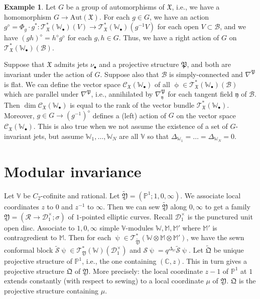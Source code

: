 \documentclass[12pt,a4paper,notitlepage]{report}
\theoremstyle{definition}
\newtheorem{eg}[df]{Example}
\theoremstyle{plain}
\newcommand{\fk}{\mathfrak}
\newcommand{\mc}{\mathcal}
\newcommand{\wtd}{\widetilde}
\newcommand{\scr}{\mathscr}
\newcommand{\yk}{\mathfrak y}
\newcommand{\mbb}{\mathbb}
\newcommand{\blt}{\bullet}
\newcommand{\Vbb}{\mathbb V}
\newcommand{\Wbb}{\mathbb W}
\newcommand{\Mbb}{\mathbb M}
\newcommand{\Cbb}{\mathbb C}
\newcommand{\Pbb}{\mathbb P}
\numberwithin{equation}{section}
\begin{document}
\begin{eg}\label{lb148}
Let $G$ be a group of automorphisms of $\fk X$, i.e., we have a homomorphism $G\rightarrow\mathrm{Aut}(\fk X)$. For each $g\in G$, we have an action $g^\diamond=\Phi_g\cdot g^*:\scr T_{\fk X}^*(\Wbb_\blt)(V)\rightarrow \scr T_{\fk X}^*(\Wbb_\blt)(g^{-1}V)$ for each open $V\subset\mc B$, and we have $(gh)^\diamond=h^\diamond g^\diamond$ for each $g,h\in G$. Thus, we have a right action of $G$ on $\scr T_{\fk X}^*(\Wbb_\blt)(\mc B)$.

Suppose that $\fk X$ admits jets $\nu_\blt$ and a projective structure $\fk P$, and both are invariant under the action of $G$. Suppose also that $\mc B$ is simply-connected and $\nabla^{\fk P}$ is flat. We can define the vector space  $\scr C_{\fk X}(\Wbb_\blt)$ of all $\upphi\in\scr T_{\fk X}^*(\Wbb_\blt)(\mc B)$ which are parallel under $\nabla^{\fk P}$, i.e., annihilated by $\nabla^{\fk P}_\yk$ for each tangent field $\yk$ of $\mc B$. Then $\dim\scr C_{\fk X}(\Wbb_\blt)$ is equal to the rank of the vector bundle $\scr T_{\fk X}^*(\Wbb_\blt)$. Moreover, $g\in G\rightarrow (g^{-1})^\diamond$ defines a (left) action of $G$ on  the vector space $\scr C_{\fk X}(\Wbb_\blt)$. This is also true when we not assume the existence of a set of $G$-invariant jets, but assume $\Wbb_1,\dots,\Wbb_N$ are all $\Vbb$ so that $\Delta_{\Wbb_1}=\dots=\Delta_{\Wbb_N}=0$.
\end{eg}







\section{Modular invariance}




Let $\Vbb$ be $C_2$-cofinite and rational. Let $\wtd{\fk Y}=(\Pbb^1;1,0,\infty)$. We associate local coordinates $z$ to $0$ and $z^{-1}$ to $\infty$. Then we can sew $\wtd{\fk Y}$ along $0,\infty$ to get a family $\fk Y=(\mc R\rightarrow\mc D_1^\times;\sigma)$ of $1$-pointed elliptic curves. Recall $\mc D_1^\times$ is the punctured unit open disc. Associate to $1,0,\infty$ simple $\Vbb$-modules $\Wbb,\Mbb,\Mbb'$ where $\Mbb'$ is contragredient to $\Mbb$. Then for each $\uppsi\in\scr T_{\wtd{\fk Y}}^*(\Wbb\otimes\Mbb\otimes\Mbb')$, we have the sewn conformal block $\wtd{\mc S}\uppsi\in \scr T_{\fk Y}^*(\Wbb)(\mc D_1^\times)$ and $\mc S\uppsi=q^{\Delta_\Mbb}\wtd{\mc S}\uppsi$. Let $\wtd{\fk Q}$ be unique projective structure of $\Pbb^1$, i.e., the one containing $(\Cbb,z)$. This in turn gives a projective structure $\fk Q$ of $\fk Y$. More precisely: the local coordinate $z-1$ of $\mbb P^1$ at $1$ extends constantly (with respect to sewing) to a local coordinate $\mu$ of $\fk Y$. $\fk Q$ is the projective structure containing $\mu$. 
\end{document}
